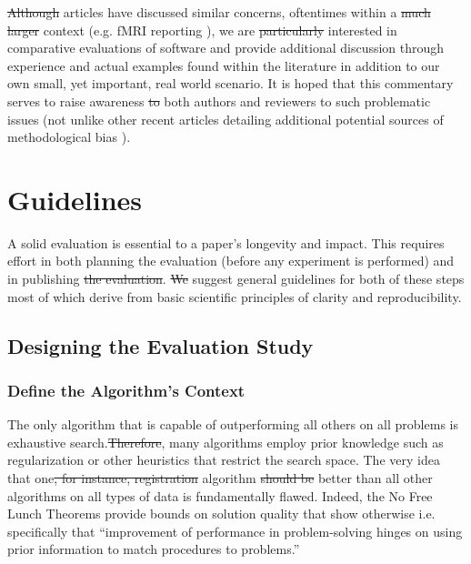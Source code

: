 \documentclass[final,5p,times,twocolumn]{elsarticle}
\newcommand{\trEdit}[1]{{\color{blue}{#1}}}
\newcommand{\trDelete}[1]{{\color{blue}\sout{#1}}}
\begin{document}
\trDelete{Although} \trEdit{Previous} articles have discussed similar concerns, oftentimes
within a \trDelete{much larger} \trEdit{specific application} context (e.g. fMRI reporting \cite{poldrack2008}), 
we are \trDelete{particularly}\trEdit{more generally} interested in comparative evaluations of software
and provide additional discussion through experience and actual 
examples found within the literature in addition to our own small,
yet important, real world scenario.
It is hoped that this commentary serves to raise awareness \trDelete{to}\trEdit{of} both 
authors and reviewers to such problematic issues (not unlike other
recent articles detailing additional potential sources of methodological 
bias \cite{kriegeskorte2009,vul2012,tustison2012}).


\section{Guidelines}
A solid evaluation is essential to a paper's longevity and
impact.  This requires effort in both planning the evaluation (before any
experiment is performed) and in publishing \trDelete{the evaluation}\trEdit{its details and results}.
\trDelete{We}\trEdit{Here, we} suggest general guidelines for both of these steps most of which
derive from basic scientific principles of clarity and reproducibility.

\subsection{Designing the Evaluation Study}


\subsubsection{Define the Algorithm's Context}
The only algorithm that is capable of outperforming all others on all
problems is exhaustive search\trEdit{, assuming a perfect objective function}.\trDelete{Therefore}\trEdit{As this is not feasible in practice}, many algorithms employ
prior knowledge such as regularization or other heuristics that
restrict the search space.  The very idea that one\trDelete{, for instance,
registration}\trEdit{(e.g., registration)} algorithm \trDelete{should be}\trEdit{could perform} better than all other algorithms on
all types of data is fundamentally flawed.  Indeed, the \trEdit{``}No Free Lunch
Theorems\trEdit{''} \trDelete{\cite{Wolpert1997}} provide bounds on solution quality that show otherwise
i.e. specifically that ``improvement of performance in problem-solving hinges on using prior information to match procedures to problems.''\trEdit{\cite{Wolpert1997}}
\end{document}
